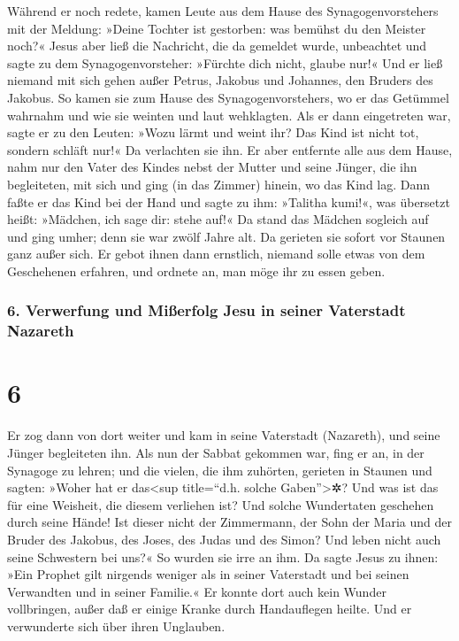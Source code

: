  Während er noch redete, kamen Leute aus dem Hause des
Synagogenvorstehers mit der Meldung: »Deine Tochter ist gestorben: was
bemühst du den Meister noch?«  Jesus aber ließ die
Nachricht, die da gemeldet wurde, unbeachtet und sagte zu dem
Synagogenvorsteher: »Fürchte dich nicht, glaube nur!« 
Und er ließ niemand mit sich gehen außer Petrus, Jakobus und Johannes,
den Bruders des Jakobus.  So kamen sie zum Hause des
Synagogenvorstehers, wo er das Getümmel wahrnahm und wie sie weinten und
laut wehklagten.  Als er dann eingetreten war, sagte er
zu den Leuten: »Wozu lärmt und weint ihr? Das Kind ist nicht tot,
sondern schläft nur!«  Da verlachten sie ihn. Er aber
entfernte alle aus dem Hause, nahm nur den Vater des Kindes nebst der
Mutter und seine Jünger, die ihn begleiteten, mit sich und ging (in das
Zimmer) hinein, wo das Kind lag.  Dann faßte er das Kind
bei der Hand und sagte zu ihm: »Talitha kumi!«, was übersetzt heißt:
»Mädchen, ich sage dir: stehe auf!«  Da stand das Mädchen
sogleich auf und ging umher; denn sie war zwölf Jahre alt. Da gerieten
sie sofort vor Staunen ganz außer sich.  Er gebot ihnen
dann ernstlich, niemand solle etwas von dem Geschehenen erfahren, und
ordnete an, man möge ihr zu essen geben.

\hypertarget{verwerfung-und-miuxdferfolg-jesu-in-seiner-vaterstadt-nazareth}{%
\subsubsection{6. Verwerfung und Mißerfolg Jesu in seiner Vaterstadt
Nazareth}\label{verwerfung-und-miuxdferfolg-jesu-in-seiner-vaterstadt-nazareth}}

\hypertarget{section-5}{%
\section{6}\label{section-5}}

 Er zog dann von dort weiter und kam in seine Vaterstadt
(Nazareth), und seine Jünger begleiteten ihn.  Als nun der
Sabbat gekommen war, fing er an, in der Synagoge zu lehren; und die
vielen, die ihm zuhörten, gerieten in Staunen und sagten: »Woher hat er
das\textless sup title=``d.h. solche Gaben''\textgreater✲? Und was ist
das für eine Weisheit, die diesem verliehen ist? Und solche Wundertaten
geschehen durch seine Hände!  Ist dieser nicht der
Zimmermann, der Sohn der Maria und der Bruder des Jakobus, des Joses,
des Judas und des Simon? Und leben nicht auch seine Schwestern bei uns?«
So wurden sie irre an ihm.  Da sagte Jesus zu ihnen: »Ein
Prophet gilt nirgends weniger als in seiner Vaterstadt und bei seinen
Verwandten und in seiner Familie.«  Er konnte dort auch
kein Wunder vollbringen, außer daß er einige Kranke durch Handauflegen
heilte.  Und er verwunderte sich über ihren Unglauben.

